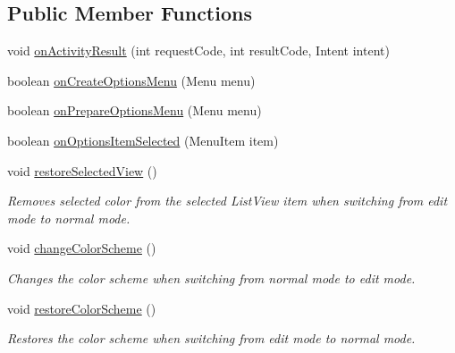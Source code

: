 \subsection*{Public Member Functions}
\begin{DoxyCompactItemize}
\item 
void \hyperlink{classorg_1_1buildmlearn_1_1toolkit_1_1activity_1_1TemplateEditor_a8dd35a4525cae8911df21beed169de02}{on\-Activity\-Result} (int request\-Code, int result\-Code, Intent intent)
\item 
boolean \hyperlink{classorg_1_1buildmlearn_1_1toolkit_1_1activity_1_1TemplateEditor_a9ce2150056a19a2bbd3222f061e1d4b2}{on\-Create\-Options\-Menu} (Menu menu)
\item 
boolean \hyperlink{classorg_1_1buildmlearn_1_1toolkit_1_1activity_1_1TemplateEditor_a4113877eb08f8665000bd3eb733737ef}{on\-Prepare\-Options\-Menu} (Menu menu)
\item 
boolean \hyperlink{classorg_1_1buildmlearn_1_1toolkit_1_1activity_1_1TemplateEditor_a619c591e1af2eba8188da92a021bc222}{on\-Options\-Item\-Selected} (Menu\-Item item)
\item 
void \hyperlink{classorg_1_1buildmlearn_1_1toolkit_1_1activity_1_1TemplateEditor_ae1fb961405f616070237c13e64f5b5bc}{restore\-Selected\-View} ()
\begin{DoxyCompactList}\small\item\em Removes selected color from the selected List\-View item when switching from edit mode to normal mode. \end{DoxyCompactList}\item 
void \hyperlink{classorg_1_1buildmlearn_1_1toolkit_1_1activity_1_1TemplateEditor_a579696858455696ea2bac7bea2dccbd0}{change\-Color\-Scheme} ()
\begin{DoxyCompactList}\small\item\em Changes the color scheme when switching from normal mode to edit mode. \end{DoxyCompactList}\item 
void \hyperlink{classorg_1_1buildmlearn_1_1toolkit_1_1activity_1_1TemplateEditor_a596abe1f201578b28de1e3491b4f8cd6}{restore\-Color\-Scheme} ()
\begin{DoxyCompactList}\small\item\em Restores the color scheme when switching from edit mode to normal mode. \end{DoxyCompactList}\end{DoxyCompactItemize}
